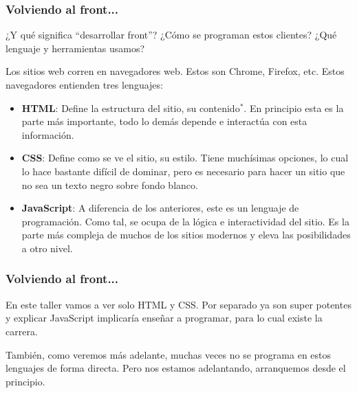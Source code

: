 \begin{frame}
    \frametitle{Volviendo al front...}

    ¿Y qué significa ``desarrollar front''? ¿Cómo se programan estos clientes? 
    ¿Qué lenguaje y herramientas usamos?

    Los sitios web corren en navegadores web. Estos son Chrome, Firefox, etc. 
    Estos navegadores entienden tres lenguajes:

    \begin{itemize}
        \item \textbf{HTML}: Define la estructura del sitio, su contenido$^*$. 
              En principio esta es la parte más importante, todo lo demás 
              depende e interactúa con esta información.
        \item \textbf{CSS}: Define como se ve el sitio, su estilo. Tiene muchísimas 
              opciones, lo cual lo hace bastante difícil de dominar, pero es 
              necesario para hacer un sitio que no sea un texto negro sobre fondo 
              blanco.
        \item \textbf{JavaScript}: A diferencia de los anteriores, este es un 
              lenguaje de programación. Como tal, se ocupa de la lógica e 
              interactividad del sitio. Es la parte más compleja de muchos 
              de los sitios modernos y eleva las posibilidades a otro nivel.
    \end{itemize}

\end{frame}

\begin{frame}
    \frametitle{Volviendo al front...}

    En este taller vamos a ver solo HTML y CSS. Por separado ya son super 
    potentes y explicar JavaScript implicaría enseñar a programar, para 
    lo cual existe la carrera.

    También, como veremos más adelante, muchas veces no se programa en 
    estos lenguajes de forma directa. Pero nos estamos adelantando, 
    arranquemos desde el principio.

\end{frame}
